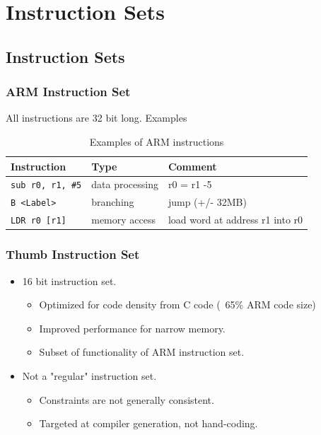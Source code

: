 \documentclass{beamer}
\begin{document}

\section{Instruction Sets}
\subsection{Instruction Sets}

\begin{frame}
\frametitle{ARM Instruction Set}
All instructions are 32 bit long.
Examples

\begin{table}
\begin{tabular}{l l l}
\toprule
\textbf{Instruction} & \textbf{Type} & \textbf{Comment}\\
\midrule
\texttt{sub r0, r1, \#5} & data processing  & r0 = r1 -5 \\
\texttt{B <Label>} & branching & jump (+/- 32MB) \\
\texttt{LDR r0 [r1]} & memory access & load word at address r1 into r0 \\
\bottomrule
\end{tabular}
\caption{Examples of ARM instructions}
\end{table}


\end{frame}



\begin{frame}
\frametitle{Thumb Instruction Set}

\begin{itemize}
\item 16 bit instruction set.
\begin{itemize}
\item Optimized for code density from C code (~65\% ARM code size)
\item Improved performance for narrow memory.
\item Subset of functionality of ARM instruction set.
\end{itemize}
\item Not a "regular" instruction set.
\begin{itemize}
\item Constraints are not generally consistent.
\item Targeted at compiler generation, not hand-coding.
\end{itemize}
\end{itemize}
\end{frame}
\end{document}
